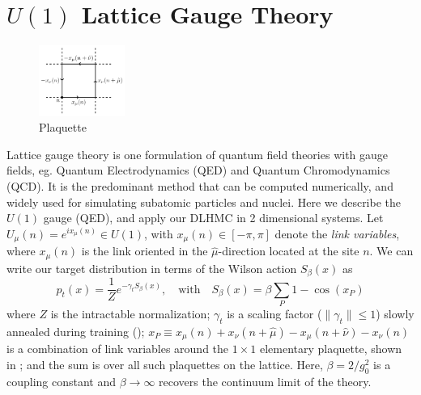 \documentclass{article} %
\begin{document}
\section{\label{sec:latticegaugetheory}\(U(1)\) Lattice Gauge Theory}
%
\begin{figure}
      \centering
      \includegraphics[width=0.25\textwidth]{figures/plaq_tikz.pdf}
      \caption{\label{fig:plaquette}Plaquette}%
\end{figure}
Lattice gauge theory is one formulation of quantum field theories with gauge fields, eg. Quantum Electrodynamics (QED)
and Quantum Chromodynamics (QCD).
%
It is the predominant method that can be computed numerically, and widely used for simulating subatomic particles and
nuclei.
%
Here we describe the \(U(1)\) gauge (QED), and apply our DLHMC in 2 dimensional systems.
%
Let \(U_{\mu}(n) = e^{i x_{\mu}(n)} \in U(1)\), with \(x_{\mu}(n) \in [-\pi,\pi]\) denote the \emph{link variables},
where \(x_{\mu}(n)\) is the link oriented in the \(\hat{\mu}\)-direction located at the site \(n\).
%
We can write our target distribution in terms of the Wilson action \(S_{\beta}(x)\) as
%
\begin{equation}
   p_{t}(x) = \frac{1}{Z}e^{-\gamma_{t} S_{\beta}(x)},\quad\text{with}\quad S_{\beta}(x) = \beta \sum_{P}1 - \cos(x_{P})
   \label{eq:wilsonaction}
\end{equation}
%
where $Z$ is the intractable normalization;
\(\gamma_{t}\) is a scaling factor (\(\|\gamma_{t}\|\le 1\)) slowly annealed during training ();
\(x_{P} \equiv x_{\mu}(n) + x_{\nu}(n+\hat{\mu}) - x_{\mu}(n+\hat{\nu}) -x_{\nu}(n)\) is a combination of link
variables around the \(1\times1\) elementary plaquette, shown in ; and the sum is over all
such plaquettes on the lattice.
%
Here, \(\beta = 2 / g_{0}^{2}\) is a coupling constant and \(\beta\rightarrow\infty\) recovers the continuum limit of
the theory. 
%
\end{document}
